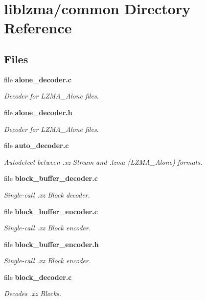 \section{liblzma/common Directory Reference}
\label{dir_db777975f8e21a5de5f283e04473bf67}
\subsection*{Files}
\begin{DoxyCompactItemize}
\item 
file \textbf{ alone\+\_\+decoder.\+c}
\begin{DoxyCompactList}\small\item\em Decoder for L\+Z\+M\+A\+\_\+\+Alone files. \end{DoxyCompactList}\item 
file \textbf{ alone\+\_\+decoder.\+h}
\begin{DoxyCompactList}\small\item\em Decoder for L\+Z\+M\+A\+\_\+\+Alone files. \end{DoxyCompactList}\item 
file \textbf{ auto\+\_\+decoder.\+c}
\begin{DoxyCompactList}\small\item\em Autodetect between .xz Stream and .lzma (L\+Z\+M\+A\+\_\+\+Alone) formats. \end{DoxyCompactList}\item 
file \textbf{ block\+\_\+buffer\+\_\+decoder.\+c}
\begin{DoxyCompactList}\small\item\em Single-\/call .xz Block decoder. \end{DoxyCompactList}\item 
file \textbf{ block\+\_\+buffer\+\_\+encoder.\+c}
\begin{DoxyCompactList}\small\item\em Single-\/call .xz Block encoder. \end{DoxyCompactList}\item 
file \textbf{ block\+\_\+buffer\+\_\+encoder.\+h}
\begin{DoxyCompactList}\small\item\em Single-\/call .xz Block encoder. \end{DoxyCompactList}\item 
file \textbf{ block\+\_\+decoder.\+c}
\begin{DoxyCompactList}\small\item\em Decodes .xz Blocks. \end{DoxyCompactList}\item 

\end{DoxyCompactItemize}
